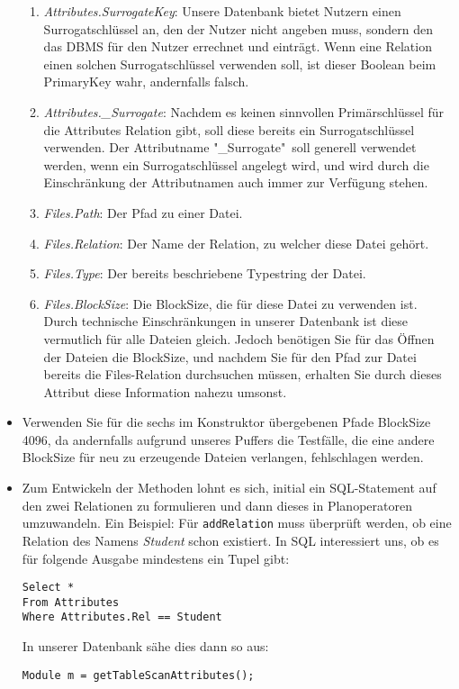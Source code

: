 \begin{itemize}
\begin{enumerate}
			\item \textit{Attributes.SurrogateKey}: Unsere Datenbank bietet Nutzern einen Surrogatschlüssel an, den der Nutzer nicht angeben muss, sondern den das DBMS für den Nutzer errechnet und einträgt. Wenn eine Relation einen solchen Surrogatschlüssel verwenden soll, ist dieser Boolean beim PrimaryKey wahr, andernfalls falsch.
			\item \textit{Attributes.\_Surrogate}: Nachdem es keinen sinnvollen Primärschlüssel für die Attributes Relation gibt, soll diese bereits ein Surrogatschlüssel verwenden.
			Der Attributname "\_Surrogate"\ soll generell verwendet werden, wenn ein Surrogatschlüssel angelegt wird, und wird durch die Einschränkung der Attributnamen auch immer zur Verfügung stehen.
			\item \textit{Files.Path}: Der Pfad zu einer Datei.
			\item \textit{Files.Relation}: Der Name der Relation, zu welcher diese Datei gehört.
			\item \textit{Files.Type}: Der bereits beschriebene Typestring der Datei.
			\item \textit{Files.BlockSize}: Die BlockSize, die für diese Datei zu verwenden ist.
				Durch technische Einschränkungen in unserer Datenbank ist diese vermutlich für alle Dateien gleich.
				Jedoch benötigen Sie für das Öffnen der Dateien die BlockSize, und nachdem Sie für den Pfad zur Datei bereits die Files-Relation durchsuchen müssen,
				erhalten Sie durch dieses Attribut diese Information nahezu umsonst.
		\end{enumerate}
	\item Verwenden Sie für die sechs im Konstruktor übergebenen Pfade BlockSize 4096, da andernfalls aufgrund unseres Puffers die Testfälle,
		die eine andere BlockSize für neu zu erzeugende Dateien verlangen, fehlschlagen werden.
	\item Zum Entwickeln der Methoden lohnt es sich, initial ein SQL-Statement auf den zwei Relationen zu formulieren und dann dieses in Planoperatoren umzuwandeln.
		Ein Beispiel: Für \texttt{addRelation} muss überprüft werden, ob eine Relation des Namens \textit{Student} schon existiert. In SQL interessiert uns, ob es für folgende Ausgabe mindestens ein Tupel gibt:
\begin{verbatim}
Select *
From Attributes
Where Attributes.Rel == Student
\end{verbatim}
In unserer Datenbank sähe dies dann so aus:
\begin{verbatim}
Module m = getTableScanAttributes();

\end{verbatim}
\end{itemize}
